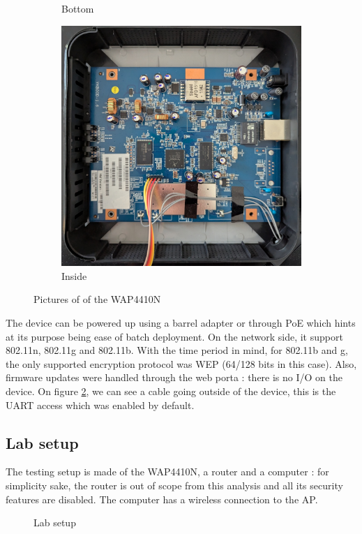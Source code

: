 \documentclass{article}
\begin{document}
\begin{figure}[!h]
\begin{subfigure}{0.3\textwidth}
		\caption{Bottom}
		\label{bottom}
	\end{subfigure}
	\begin{subfigure}{0.3\textwidth}
		\includegraphics[width=\textwidth]{inside.jpg}
		\caption{Inside}
		\label{inside}
	\end{subfigure}
	\caption{Pictures of of the WAP4410N}
	\label{wap4410n}
\end{figure}

The device can be powered up using a barrel adapter or through PoE which hints at its purpose being ease of batch deployment. On the network side, it support 802.11n, 802.11g and 802.11b. With the time period in mind, for 802.11b and g, the only supported encryption protocol was WEP (64/128 bits in this case). Also, firmware updates were handled through the web porta : there is no I/O on the device. On figure \ref{inside}, we can see a cable going outside of the device, this is the UART access which was enabled by default.
\subsection{Lab setup}
The testing setup is made of the WAP4410N, a router and a computer : for simplicity sake, the router is out of scope from this analysis and all its security features are disabled. The computer has a wireless connection to the AP.
\begin{figure}[!ht]
		
	\caption{Lab setup}
\end{figure}
\end{document}
